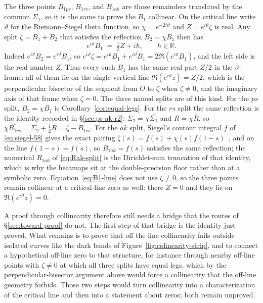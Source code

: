 \documentclass[11pt]{article}
\theoremstyle{definition}
\begin{document}
The three points $B_{1ps}$, $B_{1rs}$, and $B_{1ak}$ are those remainders
translated by the common $\Sigma_1$, so it is the same to prove the $B_1$
collinear. On the critical line write $\vartheta$ for the Riemann--Siegel
theta function, so $\chi=e^{-2i\vartheta}$ and $Z=e^{i\vartheta}\zeta$ is
real. Any split $\zeta=B_1+B_2$ that satisfies the reflection
$B_2=\chi\overline{B_1}$ then has
\begin{equation}\label{eq:B1-line}
e^{i\vartheta}B_1
\;=\;
\tfrac12 Z+ih,
\qquad h\in\mathbb R.
\end{equation}
Indeed $e^{i\vartheta}B_2=\overline{e^{i\vartheta}B_1}$, so
$e^{i\vartheta}\zeta=e^{i\vartheta}B_1+\overline{e^{i\vartheta}B_1}
=2\Re(e^{i\vartheta}B_1)$, and the left side is the real number $Z$.
Thus every such $B_1$ has the same real part $Z/2$ in the $\vartheta$-frame:
all of them lie on the single vertical line $\Re(e^{i\vartheta}z)=Z/2$,
which is the perpendicular bisector of the segment from $O$ to $\zeta$ when
$\zeta\neq0$, and the imaginary axis of that frame when $\zeta=0$.
The three named splits are of this kind. For the $ps$ split,
$B_2=\chi\overline{B_1}$ is Corollary~\ref{cor:equal-legs}. For the $rs$
split the same reflection is the identity recorded in
\S\ref{sec:ps-ak-r2}: $\Sigma_2=\chi\overline{\Sigma_1}$ and
$R=\chi\overline{R}$, so
$\chi\overline{B_{1rs}}=\Sigma_2+\tfrac12 R=\zeta-B_{1rs}$.
For the $ak$ split, Siegel's contour integral $f$ of
\eqref{eq:siegel-58} gives the exact pairing
$\zeta(s)=f(s)+\chi(s)f(1-s)$~\cite{Siegel1932}, and on the line
$f(1-s)=\overline{f(s)}$, so $B_{1ak}=f(s)$ satisfies the same
reflection; the numerical $R_{1ak}$ of \eqref{eq:Rak-split} is the
Dirichlet-sum truncation of that identity, which is why the heatmaps
sit at the double-precision floor rather than at a symbolic zero.
Equation~\eqref{eq:B1-line} does not use $\zeta\neq0$, so the three
points remain collinear at a critical-line zero as well: there $Z=0$ and
they lie on $\Re(e^{i\vartheta}z)=0$.

A proof through collinearity therefore still needs a bridge that the routes of
\S\ref{sec:toward-proof} do not. The first step of that bridge is the
identity just proved. What remains is to prove that off the line
collinearity fails outside isolated curves like the dark bands of
Figure~\ref{fig:colinearity-strip}, and to connect a hypothetical
off-line zero to that structure, for instance through nearby off-line
points with $\zeta\neq0$ at which all three splits have equal legs, which
by the perpendicular-bisector argument above would force a collinearity
that the off-line geometry forbids. Those two steps would turn
collinearity into a characterization of the critical line and then into
a statement about zeros; both remain unproved.
\end{document}
